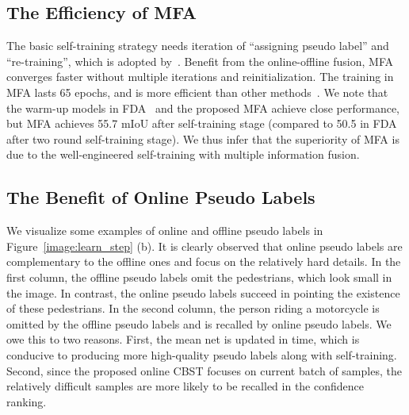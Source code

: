 \documentclass{bmvc2k}
\begin{document}
\subsection{The Efficiency of MFA}
The basic self-training strategy needs iteration of ``assigning pseudo label'' and ``re-training'', which is adopted by~\cite{RN162,RN180}. Benefit from the online-offline fusion, MFA converges faster without multiple iterations and reinitialization. The training in MFA lasts 65 epochs, and is more efficient than other methods~\cite{RN132,RN180,zhang2021prototypical,RN162}. We note that the warm-up models in FDA~\cite{RN180} and the proposed MFA achieve close performance, but MFA achieves 55.7 mIoU after self-training stage (compared to 50.5 in FDA after two round self-training stage). We thus infer that the superiority of MFA is due to the well-engineered self-training with multiple information fusion. 


\subsection{The Benefit of Online Pseudo Labels} \label{sec:Role of Online}
We visualize some examples of online and offline pseudo labels in Figure~\ref{image:learn_step} (b). It is clearly observed that online pseudo labels are complementary to the offline ones and focus on the relatively hard details. In the first column, the offline pseudo labels omit the pedestrians, which look small in the image. In contrast, the online pseudo labels succeed in pointing the existence of these pedestrians. In the second column, the person riding a motorcycle is omitted by the offline pseudo labels and is recalled by online pseudo labels. We owe this to two reasons. First, the mean net is updated in time, which is conducive to producing more high-quality pseudo labels along with self-training. Second, since the proposed online CBST focuses on current batch of samples, the relatively difficult samples are more likely to be recalled in the confidence ranking.
\end{document}
